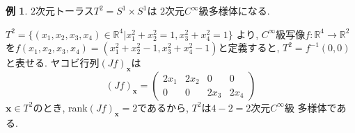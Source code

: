 \documentclass[dvipdfmx,cjk]{beamer}
\theoremstyle{definition}
\newtheorem{ex}{\textbf{ 例 }}
\newtheorem{dfn}{\textbf{ 定義 }}
\begin{document}
\begin{frame}
  \begin{ex}
    $2$次元トーラス$T^2=S^1\times S^1$は
    $2$次元$C^\infty$級多様体になる.  
  \end{ex}  
  $T^2=\{(x_1,x_2,x_3,x_4)\in \mathbb{R}^4|
  x_1^2+x_2^2=1, x_3^2+x_4^2=1\}$
  より, 
  $C^\infty$級写像$f:\mathbb{R}^4\to \mathbb{R}^2$
  を$f(x_1,x_2,x_3,x_4)=(x_1^2+x_2^2-1,
  x_3^2+x_4^2-1)$と定義すると, 
  $T^2=f^{-1}(0,0)$
  と表せる. ヤコビ行列$(Jf)_{\boldsymbol{x}}$は
  $$(Jf)_{\boldsymbol{x}}=
      \left(\begin{array}{cccc}
          2x_1&2x_2&0&0\\
          0&0&2x_3&2x_4
      \end{array}\right)$$
  $\boldsymbol{x}\in T^2$のとき, 
  rank$(Jf)_{\boldsymbol{x}}=2$であるから, 
  $T^2$は$4-2=2$次元$C^\infty$級
  多様体である.
\end{frame}


\end{document}
